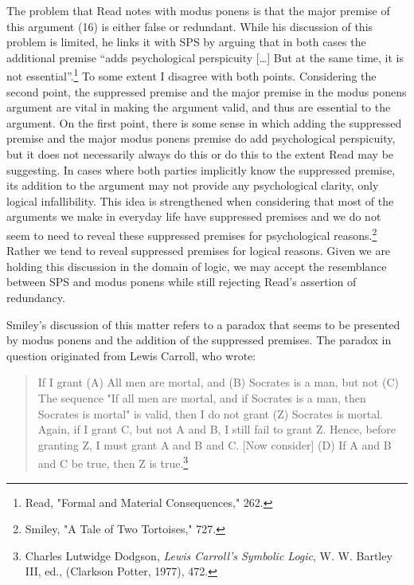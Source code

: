 The problem that Read notes with modus ponens is that the major premise
of this argument (16) is either false or redundant. While his discussion
of this problem is limited, he links it with SPS by arguing that in both
cases the additional premise ``adds psychological perspicuity
{[}\ldots{]} But at the same time, it is not essential''.\footnote{Read,
  "Formal and Material Consequences," 262.} To some extent I disagree
with both points. Considering the second point, the suppressed premise
and the major premise in the modus ponens argument are vital in making
the argument valid, and thus are essential to the argument. On the first
point, there is some sense in which adding the suppressed premise and
the major modus ponens premise do add psychological perspicuity, but it
does not necessarily always do this or do this to the extent Read may be
suggesting. In cases where both parties implicitly know the suppressed
premise, its addition to the argument may not provide any psychological
clarity, only logical infallibility. This idea is strengthened when
considering that most of the arguments we make in everyday life have
suppressed premises and we do not seem to need to reveal these
suppressed premises for psychological reasons.\footnote{Smiley, "A Tale
  of Two Tortoises," 727.} Rather we tend to reveal suppressed premises
for logical reasons. Given we are holding this discussion in the domain
of logic, we may accept the resemblance between SPS and modus ponens
while still rejecting Read's assertion of redundancy.

Smiley's discussion of this matter refers to a paradox that seems to be
presented by modus ponens and the addition of the suppressed premises.
The paradox in question originated from Lewis Carroll, who wrote:

\begin{quote}
If I grant (A) All men are mortal, and (B) Socrates is a man, but not
(C) The sequence "If all men are mortal, and if Socrates is a man, then
Socrates is mortal" is valid, then I do not grant (Z) Socrates is
mortal. Again, if I grant C, but not A and B, I still fail to grant Z.
Hence, before granting Z, I must grant A and B and C. {[}Now consider{]}
(D) If A and B and C be true, then Z is true.\footnote{Charles Lutwidge
  Dodgson, \emph{Lewis Carroll's Symbolic Logic}, W. W. Bartley III,
  ed., (Clarkson Potter, 1977), 472.}
\end{quote}

